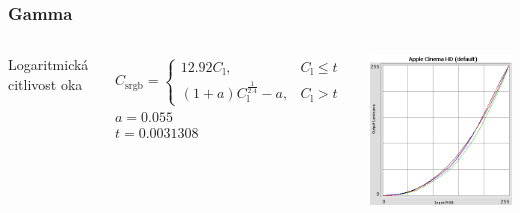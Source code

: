 \begin{frame}
    \frametitle{Gamma}

    \begin{columns}[c]
        Logaritmická citlivost oka

        \begin{eqnarray*}
        C_\mathrm{srgb}=\begin{cases}
        12.92C_\mathrm{l}, & C_\mathrm{l} \le t\\
        (1+a)C_\mathrm{l}^{\frac{1}{2.4}}-a, & C_\mathrm{l} > t
        \end{cases} \\
        a = 0.055 \\
        t = 0.0031308
        \end{eqnarray*}
        
        \includegraphics[width=\textwidth]{pics/color/monitor}
    \end{columns}
\end{frame}

